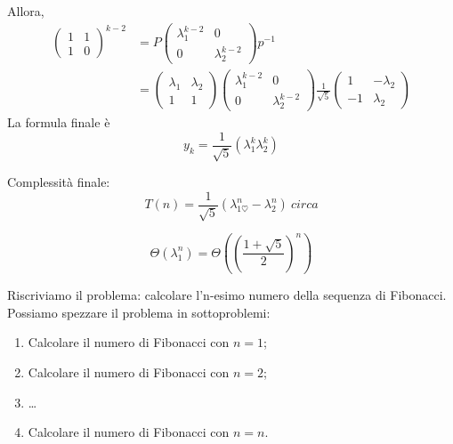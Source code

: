 Allora,
\begin{align*}
\begin{pmatrix}
    1 & 1 \\ 1 & 0
\end{pmatrix}^{k - 2} &= P \begin{pmatrix}
    \lambda_1^{k -2} & 0 \\ 0 & \lambda_2^{k -2}
\end{pmatrix} p ^{-1} \\ &= \begin{pmatrix}
    \lambda_1 & \lambda_2 \\ 1 & 1
\end{pmatrix} \begin{pmatrix}
    \lambda_1^{k -2} & 0 \\ 0 & \lambda_2^{k-2}
\end{pmatrix}\frac{1}{\sqrt{5}} \begin{pmatrix}
    1 & - \lambda_2 \\ -1 & \lambda_2
\end{pmatrix}
\end{align*}
La formula finale è
$$y_k = \frac{1}{\sqrt{5}}(\lambda^k_1\lambda^k_2)$$

Complessità finale: $$T(n) = \frac{1}{\sqrt{5}} (\lambda^n_{1\heartsuit} -  \lambda^n_2)\ circa$$

$$\Theta(\lambda_1^n) = \Theta((\frac{1 + \sqrt{5}}{2})^n)$$ \par



Riscriviamo il problema: calcolare l'n-esimo numero della sequenza di Fibonacci. Possiamo spezzare il problema in sottoproblemi:
\begin{enumerate}
    \item Calcolare il numero di Fibonacci con $n = 1$;
    \item Calcolare il numero di Fibonacci con $n = 2$;
    \item \dots
    \item Calcolare il numero di Fibonacci con $n = n$.
\end{enumerate}